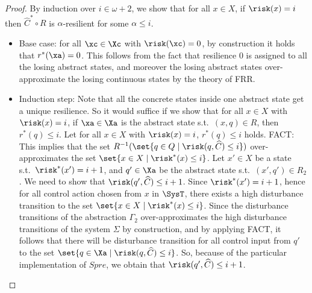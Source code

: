 \begin{proof}
	By induction over $i\in\omega+2$, we show that for all $x\in X$, if $\risk(x)=i$ then $\widehat{C}^*\circ R$ is $\alpha$-resilient for some $\alpha\leq i$.
	\begin{itemize}
		\item Base case: for all $\xc\in \Xc$ with $\risk(\xc)=0$, by construction it holds that $r^*(\xa)=0$. 
		This follows from the fact that resilience $0$ is assigned to all the losing abstract states, and moreover the losing abstract states over-approximate the losing continuous states by the theory of FRR.
		\item Induction step: Note that all the concrete states inside one abstract state get a unique resilience.
		So it would suffice if we show that for all $x\in X$ with $\risk(x)=i$, if $\xa\in \Xa$ is the abstract state s.t.\ $(x,q)\in R$, then $r^*(q) \leq i$.		
		Let for all $x\in X$ with $\risk(x)=i$, $r^*(q) \leq i$ holds.
		FACT: This implies that the set $R^{-1}(\set{q\in Q\mid \risk(q,\widehat{C})\leq i})$ over-approximates the set $\set{x\in X\mid \risk^*(x)\leq i}$.
		Let $x'\in X$ be a state s.t.\ $\risk^*(x')=i+1$, and $q'\in\Xa$ be the abstract state s.t.\ $(x',q')\in R_2$.
		We need to show that $\risk(q',\widehat{C})\leq i+1$.
		Since $\risk^*(x')=i+1$, hence for all control action chosen from $x$ in $\SysT$, there exists a high disturbance transition to the set $\set{x\in X\mid \risk^*(x)\leq i}$.
		Since the disturbance transitions of the abstraction $\Gamma_2$ over-approximates the high disturbance transitions of the system $\Sigma$ by construction, and by applying FACT, it follows that there will be disturbance transition for all control input from $q'$ to the set $\set{q\in \Xa\mid \risk(q,\widehat{C}) \leq i}$.
		So, because of the particular implementation of $Spre$, we obtain that $\risk(q',\widehat{C})\leq i+1$.
	\end{itemize}
\end{proof}